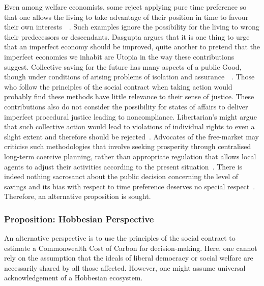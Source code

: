 \documentclass[11pt, oneside]{article}   	%
\begin{document}
Even among welfare economists, some reject applying pure time preference so that one allows the living to take advantage of their position in time to favour their own interests~\cite{hs1}~\cite{fr1}. Such examples ignore the possibility for the living to wrong their predecessors or descendants. Dasgupta argues that it is one thing to urge that an imperfect economy should be improved, quite another to pretend that the imperfect economies we inhabit are Utopia in the way these contributions suggest. Collective saving for the future has many aspects of a public Good, though under conditions of arising problems of isolation and assurance~\cite{as1}~\cite{ms1}.  Those who follow the principles of the social contract when taking action would probably find these methods have little relevance to their sense of justice. These contributions also do not consider the possibility for states of affairs to deliver imperfect procedural justice leading to noncompliance. Libertarian's might argue that such collective action would lead to violations of individual rights to even a slight extent and therefore should be rejected~\cite{rn1}. Advocates of the free-market may criticise such methodologies that involve seeking prosperity through centralised long-term coercive planning, rather than appropriate regulation that allows local agents to adjust their activities according to the present situation~\cite{fh1}. There is indeed nothing sacrosanct about the public decision concerning the level of savings and its bias with respect to time preference deserves no special respect~\cite{jr1}. Therefore, an alternative proposition is sought.

\subsubsection{Proposition: Hobbesian Perspective}

An alternative perspective is to use the principles of the social contract to estimate a Commonwealth Cost of Carbon for decision-making.
Here, one cannot rely on the assumption that the ideals of liberal democracy or social welfare are necessarily shared by all those affected.
However, one might assume universal acknowledgement of a Hobbesian ecosystem.
\end{document}
